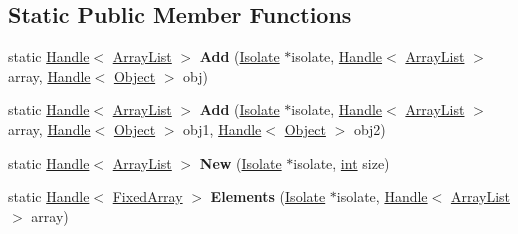 \subsection*{Static Public Member Functions}
\begin{DoxyCompactItemize}
\item 
\mbox{\label{classv8_1_1internal_1_1ArrayList_aa345d866357b59b3fe11645edeea7e50}} 
static \mbox{\hyperlink{classv8_1_1internal_1_1Handle}{Handle}}$<$ \mbox{\hyperlink{classv8_1_1internal_1_1ArrayList}{Array\+List}} $>$ {\bfseries Add} (\mbox{\hyperlink{classv8_1_1internal_1_1Isolate}{Isolate}} $\ast$isolate, \mbox{\hyperlink{classv8_1_1internal_1_1Handle}{Handle}}$<$ \mbox{\hyperlink{classv8_1_1internal_1_1ArrayList}{Array\+List}} $>$ array, \mbox{\hyperlink{classv8_1_1internal_1_1Handle}{Handle}}$<$ \mbox{\hyperlink{classv8_1_1internal_1_1Object}{Object}} $>$ obj)
\item 
\mbox{\label{classv8_1_1internal_1_1ArrayList_a82510a66008cf04516cc1fc93ef3a64c}} 
static \mbox{\hyperlink{classv8_1_1internal_1_1Handle}{Handle}}$<$ \mbox{\hyperlink{classv8_1_1internal_1_1ArrayList}{Array\+List}} $>$ {\bfseries Add} (\mbox{\hyperlink{classv8_1_1internal_1_1Isolate}{Isolate}} $\ast$isolate, \mbox{\hyperlink{classv8_1_1internal_1_1Handle}{Handle}}$<$ \mbox{\hyperlink{classv8_1_1internal_1_1ArrayList}{Array\+List}} $>$ array, \mbox{\hyperlink{classv8_1_1internal_1_1Handle}{Handle}}$<$ \mbox{\hyperlink{classv8_1_1internal_1_1Object}{Object}} $>$ obj1, \mbox{\hyperlink{classv8_1_1internal_1_1Handle}{Handle}}$<$ \mbox{\hyperlink{classv8_1_1internal_1_1Object}{Object}} $>$ obj2)
\item 
\mbox{\label{classv8_1_1internal_1_1ArrayList_a1654efa70d2ffaab0b5067c9c5cb7c7b}} 
static \mbox{\hyperlink{classv8_1_1internal_1_1Handle}{Handle}}$<$ \mbox{\hyperlink{classv8_1_1internal_1_1ArrayList}{Array\+List}} $>$ {\bfseries New} (\mbox{\hyperlink{classv8_1_1internal_1_1Isolate}{Isolate}} $\ast$isolate, \mbox{\hyperlink{classint}{int}} size)
\item 
\mbox{\label{classv8_1_1internal_1_1ArrayList_a7ca050298252a6c1db0ff05eace6113f}} 
static \mbox{\hyperlink{classv8_1_1internal_1_1Handle}{Handle}}$<$ \mbox{\hyperlink{classv8_1_1internal_1_1FixedArray}{Fixed\+Array}} $>$ {\bfseries Elements} (\mbox{\hyperlink{classv8_1_1internal_1_1Isolate}{Isolate}} $\ast$isolate, \mbox{\hyperlink{classv8_1_1internal_1_1Handle}{Handle}}$<$ \mbox{\hyperlink{classv8_1_1internal_1_1ArrayList}{Array\+List}} $>$ array)
\end{DoxyCompactItemize}
